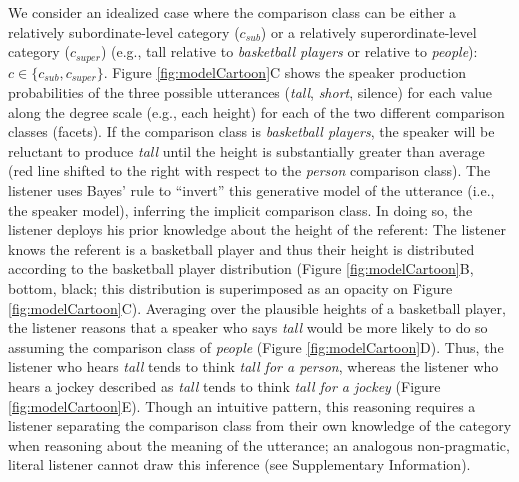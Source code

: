 \documentclass[doc]{apa6}
\begin{document}

We consider an idealized case where the comparison class can be either a relatively subordinate-level category ($c_{sub}$) or a relatively superordinate-level category ($c_{super}$) (e.g., tall relative to \emph{basketball players} or relative to \emph{people}): \(c \in \{c_{sub}, c_{super}\}\).
Figure \ref{fig:modelCartoon}C shows the speaker production probabilities of the three possible utterances (\emph{tall}, \emph{short}, silence) for each value along the degree scale (e.g., each height) for each of the two different comparison classes (facets).
If the comparison class is \emph{basketball players}, the speaker will be reluctant to produce \emph{tall} until the height is substantially greater than average (red line shifted to the right with respect to the \emph{person} comparison class).
The listener uses Bayes' rule to ``invert'' this generative model of the utterance (i.e., the speaker model), inferring the implicit comparison class.
In doing so, the listener deploys his prior knowledge about the height of the referent: The listener knows the referent is a basketball player and thus their height is distributed according to the basketball player distribution (Figure \ref{fig:modelCartoon}B, bottom, black; this distribution is superimposed as an opacity on Figure \ref{fig:modelCartoon}C).
Averaging over the plausible heights of a basketball player, the listener reasons that a speaker who says \emph{tall} would be more likely to do so assuming the comparison class of \emph{people}  (Figure \ref{fig:modelCartoon}D).
Thus, the listener who hears \emph{tall} tends to think \emph{tall for a person}, whereas the listener who hears a jockey described as \emph{tall} tends to think \emph{tall for a jockey} (Figure \ref{fig:modelCartoon}E).
Though an intuitive pattern, this reasoning requires a listener separating the comparison class from their own knowledge of the category when reasoning about the meaning of the utterance; an analogous non-pragmatic, literal listener cannot draw this inference (see Supplementary Information).

\end{document}
